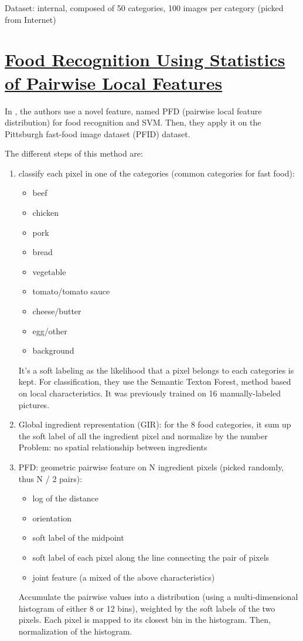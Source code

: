 Dataset: internal, composed of 50 categories, 100 images per category (picked from Internet)

\section{\href{http://ieeexplore.ieee.org/lpdocs/epic03/wrapper.htm?arnumber=5539907}{Food Recognition Using Statistics of Pairwise Local Features}}

In \cite{Yang2010}, the authors use a novel feature, named PFD (pairwise local feature distribution) for food recognition and SVM. Then, they apply it on the Pittsburgh fast-food image dataset (PFID) dataset.

The different steps of this method are:
\begin{enumerate}
    \item classify each pixel in one of the categories (common categories for fast food):
        \begin{itemize}
            \item beef
            \item chicken
            \item pork
            \item bread
            \item vegetable
            \item tomato/tomato sauce
            \item cheese/butter
            \item egg/other
            \item background
        \end{itemize}
    It's a soft labeling as the likelihood that a pixel belongs to each categories is kept.
    For classification, they use the Semantic Texton Forest, method based on local characteristics. It was previously trained on 16 manually-labeled pictures.
    
    \item Global ingredient representation (GIR): for the 8 food categories, it sum up the soft label of all the ingredient pixel and normalize by the number 
    Problem: no spatial relationship between ingredients
    
    \item PFD: geometric pairwise feature on N ingredient pixels (picked randomly, thus N / 2 pairs):
        \begin{itemize}
            \item log of the distance
            \item orientation
            \item soft label of the midpoint
            \item soft label of each pixel along the line connecting the pair of pixels
            \item joint feature (a mixed of the above characteristics)
        \end{itemize}
    Accumulate the pairwise values into a distribution (using a multi-dimensional histogram of either 8 or 12 bins), weighted by the soft labels of the two pixels. Each pixel is mapped to its closest bin in the histogram.
    Then, normalization of the histogram.
\end{enumerate}

